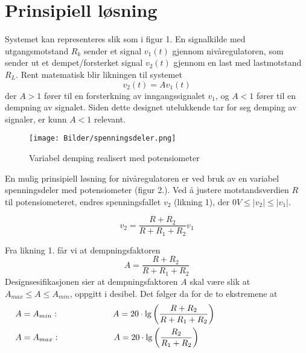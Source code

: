 \section{Prinsipiell løsning}
\label{prinsipiellLoesning}
 

Systemet kan representeres slik som i figur 1. En signalkilde
med utgangsmotstand $R_k$ sender et signal $v_1(t)$ gjennom nivåregulatoren, som sender ut 
et dempet/forsterket signal $v_2(t)$ gjennom en last med lastmotstand $R_L$. Rent matematisk 
blir likningen til systemet
\[
    v_2(t) = Av_1(t)
\]
der $A > 1$ fører til en forsterkning av inngangssignalet $v_1$, 
og $A < 1$ fører til en dempning av signalet. Siden dette designet utelukkende tar for seg demping 
av signaler, er kunn $A < 1$ relevant.

\begin{figure}[H]
    \centering
    \texttt{[image: Bilder/spenningsdeler.png]}
    \caption{Variabel demping realisert med potensiometer \cite{teknot}}
    \label{fig:spenningsdeler}
\end{figure}

En mulig prinsipiell løsning for nivåregulatoren er ved bruk av en variabel spenningsdeler med potensiometer (figur 2.).
Ved å justere motstandsverdien $R$ til potensiometeret, endres spenningsfallet $v_2$ (likning 1), der $0V \leq |v_2| \leq |v_1|$.

\begin{equation}
    v_2 = \frac{R + R_2}{R + R_1 + R_2}v_1
\end{equation}

Fra likning 1. får vi at dempningsfaktoren
\[
    A = \frac{R + R_2}{R + R_1 + R_2}
\]
Designsesifikasjonen sier at dempningsfaktoren $A$ skal være slik at
$A_{max} \leq A \leq A_{min}$, oppgitt i desibel. Det følger da for de to
ekstremene at
\begin{align}
    &A = A_{min}: \hspace{2.25cm} A = 20 \cdot \lg{\left(\frac{R + R_2}{R + R_1 + R_2}\right)} \hspace{3.5cm}\\ 
    &A = A_{max}: \hspace{2.25cm} A = 20 \cdot \lg{\left(\frac{R_2}{R_1 + R_2}\right)} \hspace{3.5cm} 
\end{align}
